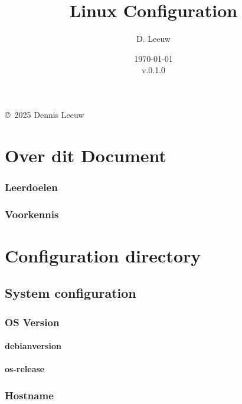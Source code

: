 \documentclass[a4paper,12pt,twoside,openright,titlepage]{book}
\author{D. Leeuw}
\title{Linux Configuration}
\date{\today\\v.0.1.0}
\begin{document}

\maketitle

\copyright\ 2025 Dennis Leeuw\\




\frontmatter
\chapter{Over dit Document}
\subsection{Leerdoelen}

\subsection{Voorkennis}



\tableofcontents

\mainmatter

\chapter{Configuration directory}


\section{System configuration}
\subsection{OS Version}
\subsubsection{debian\textunderscore version}

\subsubsection{os-release}

\subsection{Hostname}

\end{document}
